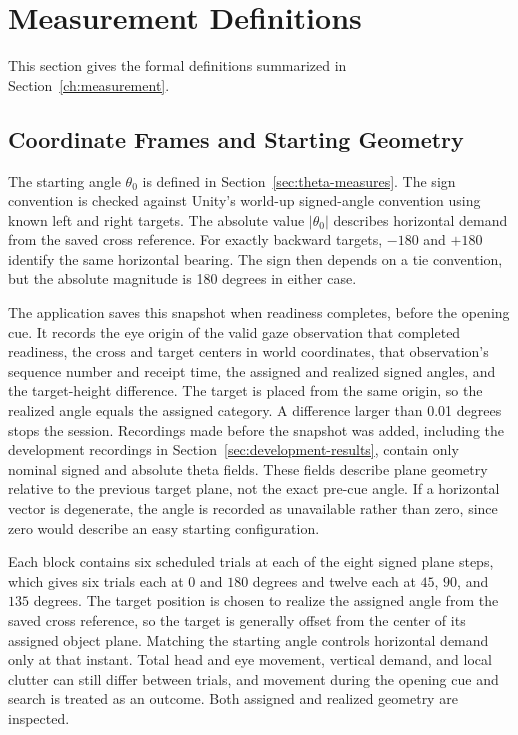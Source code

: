 \section{Measurement Definitions}
\label{app:measurement-definitions}
This section gives the formal definitions summarized in Section~\ref{ch:measurement}.

\subsection{Coordinate Frames and Starting Geometry}
\label{sec:starting-geometry}
The starting angle $\theta_0$ is defined in Section~\ref{sec:theta-measures}. The sign convention is checked against Unity's world-up signed-angle convention using known left and right targets. The absolute value $|\theta_0|$ describes horizontal demand from the saved cross reference. For exactly backward targets, $-180$ and $+180$ identify the same horizontal bearing. The sign then depends on a tie convention, but the absolute magnitude is 180 degrees in either case.

The application saves this snapshot when readiness completes, before the opening cue. It records the eye origin of the valid gaze observation that completed readiness, the cross and target centers in world coordinates, that observation's sequence number and receipt time, the assigned and realized signed angles, and the target-height difference. The target is placed from the same origin, so the realized angle equals the assigned category. A difference larger than 0.01 degrees stops the session. Recordings made before the snapshot was added, including the development recordings in Section~\ref{sec:development-results}, contain only nominal signed and absolute theta fields. These fields describe plane geometry relative to the previous target plane, not the exact pre-cue angle. If a horizontal vector is degenerate, the angle is recorded as unavailable rather than zero, since zero would describe an easy starting configuration.

Each block contains six scheduled trials at each of the eight signed plane steps, which gives six trials each at $0$ and $180$ degrees and twelve each at $45$, $90$, and $135$ degrees. The target position is chosen to realize the assigned angle from the saved cross reference, so the target is generally offset from the center of its assigned object plane. Matching the starting angle controls horizontal demand only at that instant. Total head and eye movement, vertical demand, and local clutter can still differ between trials, and movement during the opening cue and search is treated as an outcome. Both assigned and realized geometry are inspected.

